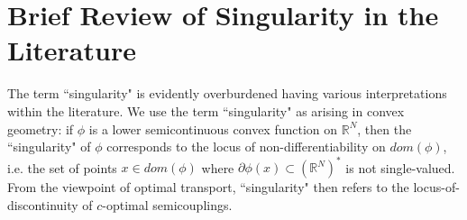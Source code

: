 \documentclass[12pt]{amsart}
\theoremstyle{definition}
\theoremstyle{remark}
\newcommand{\bR}{\mathbb{R}}
\newcommand{\del}{\partial}
\begin{document}










\section{Brief Review of Singularity in the Literature}
The term ``singularity" is evidently overburdened having various interpretations within the literature. We use the term ``singularity" as arising in convex geometry: if $\phi$ is a lower semicontinuous convex function on $\bR^N$, then the ``singularity" of $\phi$ corresponds to the locus of non-differentiability on $dom(\phi)$, i.e. the set of points $x\in dom(\phi)$ where $\del\phi(x)\subset (\bR^N)^*$ is not single-valued. From the viewpoint of optimal transport, 
``singularity" then refers to the locus-of-discontinuity of $c$-optimal semicouplings. 



\end{document}
